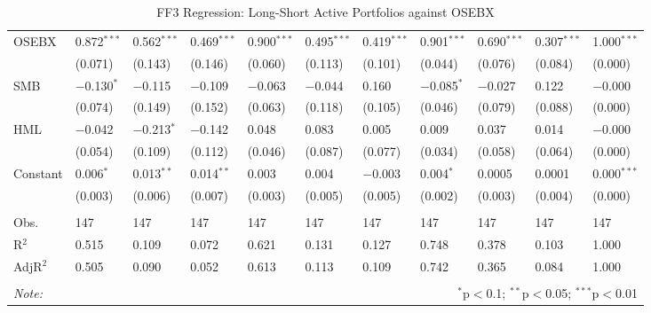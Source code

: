 \begin{appendices}
\begin{table}[H]
\begin{tabularx}{\textwidth}{XXXXXXXXXXl}
 OSEBX & 0.872$^{***}$ & 0.562$^{***}$ & 0.469$^{***}$ & 0.900$^{***}$ & 0.495$^{***}$ & 0.419$^{***}$ & 0.901$^{***}$ & 0.690$^{***}$ & 0.307$^{***}$ & 1.000$^{***}$ \\ 
  & (0.071) & (0.143) & (0.146) & (0.060) & (0.113) & (0.101) & (0.044) & (0.076) & (0.084) & (0.000) \\ 
 SMB & $-$0.130$^{*}$ & $-$0.115 & $-$0.109 & $-$0.063 & $-$0.044 & 0.160 & $-$0.085$^{*}$ & $-$0.027 & 0.122 & $-$0.000 \\ 
  & (0.074) & (0.149) & (0.152) & (0.063) & (0.118) & (0.105) & (0.046) & (0.079) & (0.088) & (0.000) \\ 
 HML & $-$0.042 & $-$0.213$^{*}$ & $-$0.142 & 0.048 & 0.083 & 0.005 & 0.009 & 0.037 & 0.014 & $-$0.000 \\ 
  & (0.054) & (0.109) & (0.112) & (0.046) & (0.087) & (0.077) & (0.034) & (0.058) & (0.064) & (0.000) \\ 
 Constant & 0.006$^{*}$ & 0.013$^{**}$ & 0.014$^{**}$ & 0.003 & 0.004 & $-$0.003 & 0.004$^{*}$ & 0.0005 & 0.0001 & 0.000$^{***}$ \\ 
  & (0.003) & (0.006) & (0.007) & (0.003) & (0.005) & (0.005) & (0.002) & (0.003) & (0.004) & (0.000) \\ 
\hline \\[-1.8ex] 
Obs. & 147 & 147 & 147 & 147 & 147 & 147 & 147 & 147 & 147 & 147 \\ 
R$^{2}$ & 0.515 & 0.109 & 0.072 & 0.621 & 0.131 & 0.127 & 0.748 & 0.378 & 0.103 & 1.000 \\ 
AdjR$^{2}$ & 0.505 & 0.090 & 0.052 & 0.613 & 0.113 & 0.109 & 0.742 & 0.365 & 0.084 & 1.000 \\ 


\hline 
\hline \\[-2ex] 
\textit{Note:}  & \multicolumn{10}{r}{$^{*}$p$<$0.1; $^{**}$p$<$0.05; $^{***}$p$<$0.01} \\ 
\end{tabularx}
\vspace{1em}
\caption{{FF3 Regression: Long-Short Active Portfolios against OSEBX}} 
\label{FF3-long-short-active-osebx} 
\end{table} 




\end{appendices}
